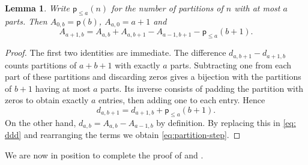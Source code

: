 \documentclass[11pt,a4paper,reqno]{amsart}
\numberwithin{equation}{section}
\newtheorem{lemma}[theorem]{Lemma}
\theoremstyle{definition}
\theoremstyle{remark}
\theoremstyle{plain}
\newcommand{\Part}{\mathsf p}
\begin{document}
\begin{lemma}\label{lem:partition-step}
Write $\Part_{\leq a}(n)$ for the number of partitions of $n$ with at most $a$ parts.
Then $A_{0,b}=\Part(b)$, $A_{a,0}=a+1$ and
\begin{equation}\label{eq:partition-step}
 A_{a+1,b}=A_{a,b}+A_{a,b+1}-A_{a-1,b+1}           -\Part_{\leq a}(b+1).
\end{equation}
\end{lemma}
\begin{proof}
The first two identities are immediate.
The difference $d_{a,b+1}-d_{a+1,b}$ counts partitions of $a+b+1$ with exactly $a$ parts.
Subtracting one from each part of these partitions and discarding zeros gives a bijection with the partitions of $b+1$ having at most $a$ parts.
Its inverse consists of padding the partition with zeros to obtain exactly $a$ entries, then adding one to each entry.
Hence
\begin{equation}\label{eq: ddd}
  d_{a,b+1}=d_{a+1,b}+\Part_{\leq a}(b+1).   
\end{equation}
On the other hand,  $d_{a,b}=A_{a,b}-A_{a-1,b}$ by definition. 
By replacing this in \eqref{eq: ddd} and rearranging the terms we obtain  \eqref{eq:partition-step}. 
\end{proof}

We are now in position to complete the proof of  and .
\end{document}
